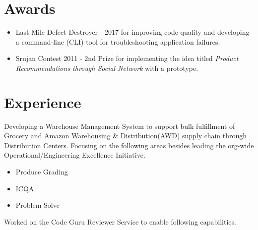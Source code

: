 \documentclass[10pt]{article}
\begin{document}
\begin{minipage}[t]{0.40\textwidth}
\section*{Awards}
\begin{itemize}
\item Last Mile Defect Destroyer - 2017 for improving code quality and developing a command-line (CLI) tool for troubleshooting application failures.
\item Srujan Contest 2011 - 2nd Prize for implementing the idea titled {\sl Product Recommendations through Social Network} with a prototype. 
\end{itemize}

\end{minipage}
\hfill
\begin{minipage}[t]{0.55\textwidth}
\vspace{5pt}
\section*{Experience}
\begin{flushright}


\RaggedRight Developing a Warehouse Management System to support bulk fulfillment of Grocery and Amazon Warehousing \& Distribution(AWD) supply chain through Distribution Centers. Focusing on the following areas besides leading the org-wide Operational/Engineering Excellence Initiative.
\begin{itemize}
\item {Produce Grading}
\item ICQA
\item {Problem Solve}
\end{itemize}

\RaggedRight Worked on the Code Guru Reviewer Service to enable following capabilities.


\end{flushright}
\end{minipage}
\end{document}
